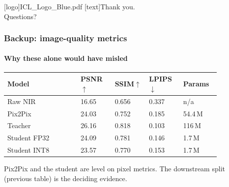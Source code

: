 \documentclass[
	aspectratio=169,
	t,
	onlytextwidth,
	10pt,
]{beamer}
\begin{document}

\begingroup
	[logo]{ICL_Logo_Blue.pdf}
	[text]{Thank you.\\ Questions?}
\endgroup


\begingroup
	\begin{frame}[plain]
		\vfill
		\vfill
	\end{frame}
\endgroup

\begin{frame}
	\frametitle{Backup: image-quality metrics}
	\framesubtitle{Why these alone would have misled}

	\centering
	\small
	\begin{tabular}{L{0.30\linewidth} C{0.14\linewidth} C{0.14\linewidth} C{0.14\linewidth} C{0.14\linewidth}}
		\toprule
		\textbf{Model} & \textbf{PSNR$\uparrow$} & \textbf{SSIM$\uparrow$} & \textbf{LPIPS$\downarrow$} & \textbf{Params}\\
		\midrule
		Raw NIR        & 16.65 & 0.656 & 0.337 & n/a\\
		Pix2Pix        & 24.03 & 0.752 & 0.185 & 54.4\,M\\
		Teacher        & 26.16 & 0.818 & 0.103 & 116\,M\\
		Student FP32   & 24.09 & 0.781 & 0.146 & 1.7\,M\\
		Student INT8   & 23.57 & 0.770 & 0.153 & 1.7\,M\\
		\bottomrule
	\end{tabular}

	\vspace{0.5\baselineskip}
	{\small Pix2Pix and the student are level on pixel metrics. The downstream split (previous table) is the deciding evidence.}
\end{frame}
\end{document}
